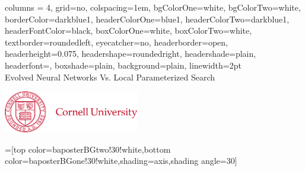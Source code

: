 \documentclass[portrait,final]{baposter}
\begin{document}
\begin{poster}{
  columns = 4,
  grid=no,
  colspacing=1em,
  bgColorOne=white,
  bgColorTwo=white,
  borderColor=darkblue1,
  headerColorOne=blue1,
  headerColorTwo=darkblue1,
  headerFontColor=black,
  boxColorOne=white,
  boxColorTwo=white,
  textborder=roundedleft,
  eyecatcher=no,
  headerborder=open,
  headerheight=0.075\textheight,
  headershape=roundedright,
  headershade=plain,
  headerfont=\normalsize\textsf, %
  boxshade=plain,
  background=plain,
  linewidth=2pt
  }
  {} %
  {\sf %
  \vspace{.4em}{\huge Generating Gaits for Physical Quadruped Robots:} \\{\LARGE Evolved Neural Networks Vs. Local Parameterized Search}\vspace{.3em}}
  {\sf %
  \vspace{-.25em}{\normalsize Jason Yosinski, Jeff Clune, Diana Hidalgo, Sarah Nguyen, Juan Cristobal Zagal, Hod Lipson}\\\hspace{0.3em}
  \hspace{3em}
  }
  {{\begin{minipage}{.25\textwidth}
    \hfill
    \includegraphics[height=5.0em]{cornellLogo}
  \end{minipage}}
  }

  =[top color=baposterBGtwo!30!white,bottom color=baposterBGone!30!white,shading=axis,shading angle=30]

     \newlength{\leftimgwidth}
     \setlength{\leftimgwidth}{0.78em+8.0em}


\end{poster}
\end{document}
